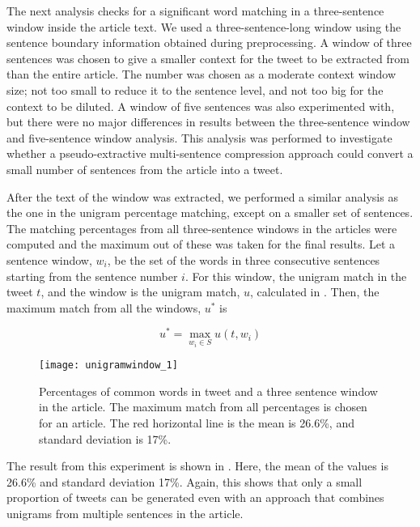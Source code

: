 The next analysis checks for a significant word matching in a three-sentence window inside the article text. We used a three-sentence-long window using the sentence boundary information obtained during preprocessing. A window of three sentences was chosen to give a smaller context for the tweet to be extracted from than the entire article. The number was chosen as a moderate context window size; not too small to reduce it to the sentence level, and not too big for the context to be diluted. A window of five sentences was also experimented with, but there were no major differences in results between the three-sentence window and five-sentence window analysis. This analysis was performed to investigate whether a pseudo-extractive multi-sentence compression approach could convert a small number of sentences from the article into a tweet.

After the text of the window was extracted, we performed a similar analysis as the one in the unigram percentage matching, except on a smaller set of sentences. The matching percentages from all three-sentence windows in the articles were computed and the maximum out of these was taken for the final results. Let a sentence window, $w_i$, be the set of the words in three consecutive sentences starting from the sentence number $i$. For this window, the unigram match in the tweet $t$, and the window is the unigram match, $u$, calculated in . Then, the maximum match from all the windows, $u^*$ is 

\begin{equation}
u^* = \max_{w_i \in S} u(t, w_i)
\end{equation}

\begin{figure}[!t]
\centering
\texttt{[image: unigramwindow\_1]}
\caption[Match percentages in tweet against window in article]{Percentages of common words in tweet and a three sentence window in the article. The maximum match from all percentages is chosen for an article. The red horizontal line is the mean is 26.6\%, and standard deviation is 17\%.}
\label{fig:unigramwindow}
\end{figure}

The result from this experiment is shown in . Here, the mean of the values is 26.6\% and standard deviation 17\%. Again, this shows that only a small proportion of tweets can be generated even with an approach that combines unigrams from multiple sentences in the article.

